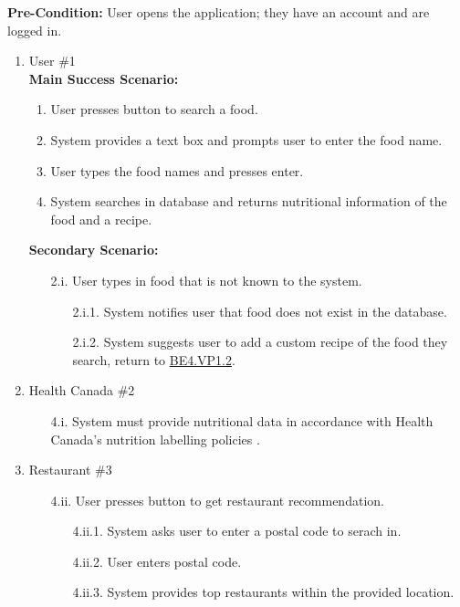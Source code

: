 \documentclass[]{article}
\begin{document}
\begin{enumerate}[{\bf BE1.}]
	\textbf{Pre-Condition:} User opens the application; they have an account and are logged in.
		\begin{enumerate}[{\bf VP1.}]
			\item User \#1 \\
				\textbf{Main Success Scenario:} 
				\begin{enumerate}[{1.}]
					\item User presses button to search a food.
					\item System provides a text box and prompts user to enter the food name.
					\item User types the food names and presses enter.
					\item System searches in database and returns nutritional information of the food and a recipe.
				\end{enumerate}
				\textbf{Secondary Scenario:}
				\begin{enumerate}
					\item[2.i.] User types in food that is not known to the system.
					\begin{enumerate}
						\item[2.i.1.] System notifies user that food does not exist in the database.
						\item[2.i.2.] System suggests user to add a custom recipe of the food they search, return to \hyperlink{BE4.VP1.2}{BE4.VP1.2}.
					\end{enumerate}
				\end{enumerate}
			\item Health Canada  \#2
				\begin{enumerate}
					\item[4.i.] System must provide nutritional data in accordance with Health Canada's nutrition labelling policies \cite{CanadaNutrition}.
				\end{enumerate}
			\item Restaurant \#3
				\begin{enumerate}
					\item[4.ii.] User presses button to get restaurant recommendation.
					\begin{enumerate}
						\item[4.ii.1.] System asks user to enter a postal code to serach in.
						\item[4.ii.2.] User enters postal code.
						\item[4.ii.3.] System provides top restaurants within the provided location.
					\end{enumerate}
					

\end{enumerate}
\end{enumerate}
\end{enumerate}
\end{document}
